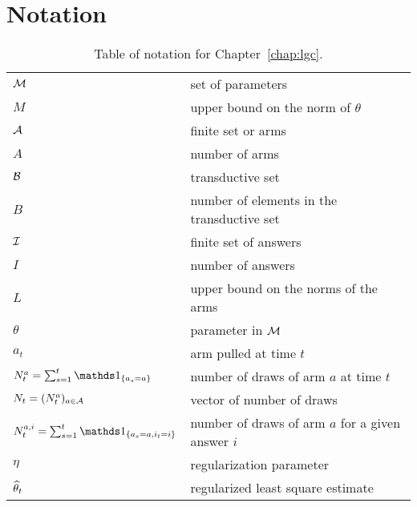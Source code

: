 \section{Notation}\label{app:lgc.notations}

\begin{table}[ht]
	\centering
	\caption{Table of notation for Chapter~\ref{chap:lgc}.}
	\begin{tabular}{@{}l|l@{}}
		\toprule
		\thead{Notation} & \thead{Meaning} \\ \midrule
		$\mathcal{M}$ & set of parameters \\
        $M$ & upper bound on the norm of $\theta$\\
		$\mathcal{A}$ & finite set or arms  \\
        $A$ & number of arms \\
        $\mathcal{B}$ & transductive set \\
        $B$ & number of elements in the transductive set \\
        $\mathcal{I}$ & finite set of answers \\
        $I$ & number of answers \\
        $L$ & upper bound on the norms of the arms\\
        $\theta$ & parameter in $\mathcal{M}$ \\
        $a_t$ & arm pulled at time $t$ \\
        $N_t^a = \sum_{s=1}^t \ind_{\{a_s = a\}}$ & number of draws of arm $a$ at time $t$\\
        $N_t =(N_t^a)_{a\in\mathcal{A}}$ & vector of number of draws\\
        $N_t^{a,i} = \sum_{s=1}^t \ind_{\{a_s = a, i_t = i\}}$ & number of draws of arm $a$ for a given answer $i$\\
        $\eta$ & regularization parameter\\
        $\widehat{\theta}_t$ & regularized least square estimate\\
		\bottomrule
	\end{tabular}
\end{table}
